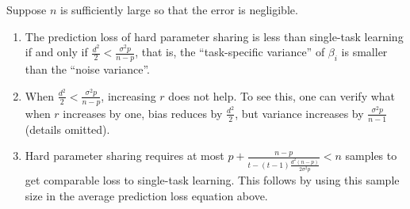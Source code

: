 	Suppose $n$ is sufficiently large so that the error is negligible.
\begin{enumerate}
	\item The prediction loss of hard parameter sharing is less than single-task learning if and only if $\frac{d^2}{2} < \frac{\sigma^2 p}{n - p}$, that is, the ``task-specific variance'' of $\beta_i$ is smaller than the ``noise variance''.
	\item When $\frac{d^2}{2} < \frac{\sigma^2 p}{n - p}$, increasing $r$ does not help.
	To see this, one can verify what when $r$ increases by one, bias reduces by $\frac{d^2}{2}$, but variance increases by $\frac{\sigma^2 p}{n-1}$ (details omitted).
	\item Hard parameter sharing requires at most $p + \frac{n - p}{t - (t - 1)\frac{d^2 (n - p)}{2\sigma^2 p}} < n$ samples to get comparable loss to single-task learning.
	This follows by using this sample size in the average prediction loss equation above.
\end{enumerate}


